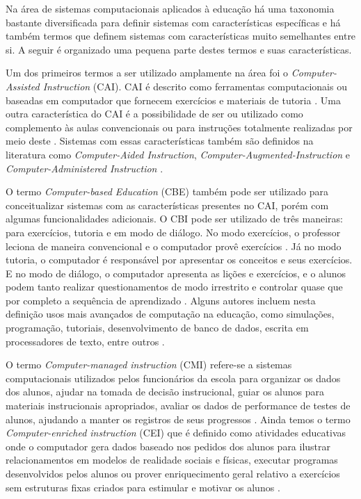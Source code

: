 
Na área de sistemas computacionais aplicados à educação há uma taxonomia bastante diversificada para definir sistemas com características específicas e há também termos que definem sistemas com características muito semelhantes entre si. A seguir é organizado uma pequena parte destes termos e suas características.

Um dos primeiros termos a ser utilizado amplamente na área foi o \emph{Computer-Assisted Instruction} (CAI). CAI é descrito como ferramentas computacionais ou baseadas em computador que fornecem exercícios e materiais de tutoria \cite{wheres98}. Uma outra característica do CAI é a possibilidade de ser ou utilizado como complemento às aulas convencionais ou para instruções totalmente realizadas por meio deste \cite{cotton91}. Sistemas com essas características também são definidos na literatura como \emph{Computer-Aided Instruction}, \emph{Computer-Augmented-Instruction} e \emph{Computer-Administered Instruction} \cite{effectiveness85}.

O termo \emph{Computer-based Education} (CBE) também pode ser utilizado para conceitualizar sistemas com as características presentes no CAI, porém com algumas funcionalidades adicionais. O CBI pode ser utilizado de três maneiras: para exercícios, tutoria e em modo de diálogo. No modo exercícios, o  professor leciona de maneira convencional e o computador provê exercícios \cite{wheres98}. Já no modo tutoria, o computador é responsável por apresentar os conceitos e seus exercícios. E no modo de diálogo, o computador apresenta as lições e exercícios, e o alunos podem tanto realizar questionamentos de modo irrestrito e controlar quase que por completo a sequência de aprendizado \cite{wheres98}. Alguns autores incluem nesta definição usos mais avançados de computação na educação, como simulações, programação, tutoriais, desenvolvimento de banco de dados, escrita em processadores de texto, entre outros \cite{cotton91}.


O termo \emph{Computer-managed instruction} (CMI) refere-se a sistemas computacionais utilizados pelos funcionários da escola para organizar os dados dos alunos, ajudar na tomada de decisão instrucional, guiar os alunos para materiais instrucionais apropriados, avaliar os dados de performance de testes de alunos, ajudando a manter os registros de seus progressos \cite{cotton91, wheres98}. Ainda temos o termo \emph{Computer-enriched instruction} (CEI) que é definido como atividades educativas onde o computador gera dados baseado nos pedidos dos alunos para ilustrar relacionamentos em modelos de realidade sociais e físicas, executar programas desenvolvidos pelos alunos ou prover enriquecimento geral relativo a exercícios sem estruturas fixas criados para estimular e motivar os alunos \cite{cotton91}.

